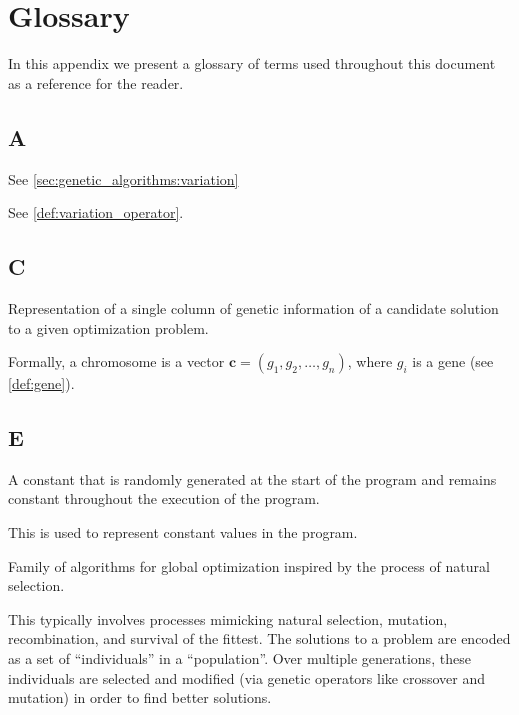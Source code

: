 \chapter{Glossary}
\label{appendix:glossary}
  In this appendix we present a glossary of terms used throughout this document as a reference for
  the reader.

  \section*{A}
    \begin{definition}[Alteration]
    \label{def:alteration}
      See \vref{sec:genetic_algorithms:variation}
    \end{definition}

    \begin{definition}[Alterer]
    \label{def:alterer}
      See \vref{def:variation_operator}.
    \end{definition}

  \section*{C}
    \begin{definition}[Chromosome]
    \label{def:chromosome}
      Representation of a single column of genetic information of a candidate solution to a given
      optimization problem.

      Formally, a chromosome is a vector \(\textbf{c} = (g_1, g_2, \dots, g_n)\), where \(g_i\) is a
      gene (see \vref{def:gene}).
    \end{definition}

  \section*{E}
    \begin{definition}
    \label{def:ephemeral_constant}
      A constant that is randomly generated at the start of the program and 
      remains constant throughout the execution of the program.

      This is used to represent constant values in the program.
    \end{definition}

    \begin{definition}
    \label{def:evolutionary_computation}
      Family of algorithms for global optimization inspired by the process of natural selection.

      This typically involves processes mimicking natural selection, mutation, recombination, and 
      survival of the fittest. 
      The solutions to a problem are encoded as a set of \enquote{individuals} in a 
      \enquote{population}. 
      Over multiple generations, these individuals are selected and modified (via genetic operators 
      like crossover and mutation) in order to find better solutions.
    \end{definition}
    
